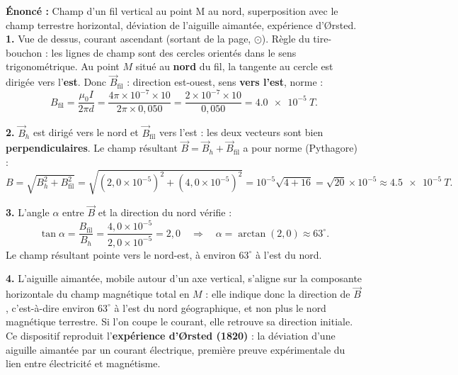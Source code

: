 \documentclass[11pt]{article}
\begin{document}
\begin{corrige}
\textbf{Énoncé :} Champ d'un fil vertical au point M au nord, superposition avec le champ terrestre horizontal, déviation de l'aiguille aimantée, expérience d'Ørsted.
\tcblower
\textbf{1.} Vue de dessus, courant ascendant (sortant de la page, $\odot$). Règle du tire-bouchon : les lignes de champ sont des cercles orientés dans le sens trigonométrique. Au point $M$ situé au \textbf{nord} du fil, la tangente au cercle est dirigée vers l'\textbf{est}. Donc $\vec{B}_{\text{fil}}$ : direction est-ouest, sens \textbf{vers l'est}, norme :
\[ B_{\text{fil}} = \frac{\mu_0 I}{2\pi d} = \frac{4\pi\times 10^{-7}\times 10}{2\pi\times 0{,}050} = \frac{2\times 10^{-7}\times 10}{0{,}050} = \SI{4,0e-5}{T}. \]

\textbf{2.} $\vec{B}_h$ est dirigé vers le nord et $\vec{B}_{\text{fil}}$ vers l'est : les deux vecteurs sont bien \textbf{perpendiculaires}. Le champ résultant $\vec{B} = \vec{B}_h + \vec{B}_{\text{fil}}$ a pour norme (Pythagore) :
\[ B = \sqrt{B_h^2 + B_{\text{fil}}^2} = \sqrt{(2{,}0\times 10^{-5})^2 + (4{,}0\times 10^{-5})^2} = 10^{-5}\sqrt{4 + 16} = \sqrt{20}\times 10^{-5} \approx \SI{4,5e-5}{T}. \]

\textbf{3.} L'angle $\alpha$ entre $\vec{B}$ et la direction du nord vérifie :
\[ \tan\alpha = \frac{B_{\text{fil}}}{B_h} = \frac{4{,}0\times 10^{-5}}{2{,}0\times 10^{-5}} = 2{,}0 \quad\Rightarrow\quad \alpha = \arctan(2{,}0) \approx 63^{\circ}. \]
Le champ résultant pointe vers le nord-est, à environ $63^{\circ}$ à l'est du nord.

\textbf{4.} L'aiguille aimantée, mobile autour d'un axe vertical, s'aligne sur la composante horizontale du champ magnétique total en $M$ : elle indique donc la direction de $\vec{B}$, c'est-à-dire environ $63^{\circ}$ à l'est du nord géographique, et non plus le nord magnétique terrestre. Si l'on coupe le courant, elle retrouve sa direction initiale.
Ce dispositif reproduit l'\textbf{expérience d'Ørsted (1820)} : la déviation d'une aiguille aimantée par un courant électrique, première preuve expérimentale du lien entre électricité et magnétisme.
\end{corrige}
\end{document}
